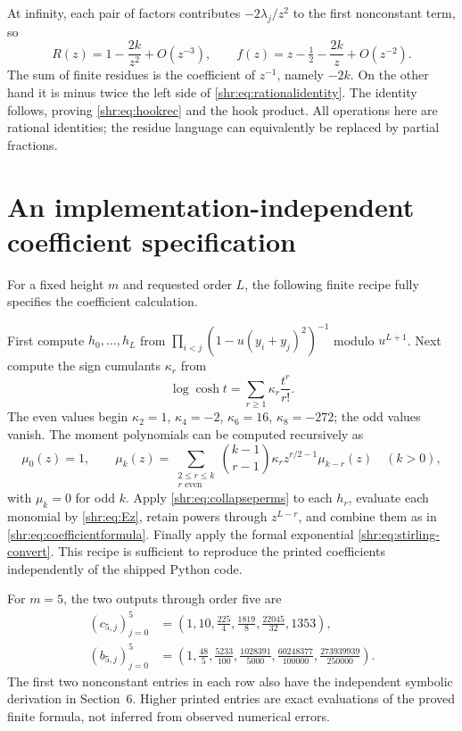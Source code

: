\documentclass[11pt,letterpaper]{article}
\numberwithin{equation}{section}
\theoremstyle{definition}
\newcommand{\1}{\mathbf 1}
\begin{document}
At infinity, each pair of factors contributes $-2\lambda_j/z^2$ to the
first nonconstant term, so
\[
 R(z)=1-\frac{2k}{z^2}+O(z^{-3}),\qquad
 f(z)=z-\tfrac12-\frac{2k}{z}+O(z^{-2}).
\]
The sum of finite residues is the coefficient of $z^{-1}$, namely $-2k$.
On the other hand it is minus twice the left side of
\eqref{shr:eq:rationalidentity}. The identity follows, proving
\eqref{shr:eq:hookrec} and the hook product. All operations here are rational
identities; the residue language can equivalently be replaced by partial
fractions.

\section{An implementation-independent coefficient specification}

For a fixed height $m$ and requested order $L$, the following finite recipe
fully specifies the coefficient calculation.

First compute $h_0,\ldots,h_L$ from
$\prod_{i<j}(1-u(y_i+y_j)^2)^{-1}$ modulo $u^{L+1}$.
Next compute the sign cumulants $\kappa_r$ from
\[
 \log\cosh t=\sum_{r\ge1}\kappa_r\frac{t^r}{r!}.
\]
The even values begin $\kappa_2=1$, $\kappa_4=-2$, $\kappa_6=16$,
$\kappa_8=-272$; the odd values vanish. The moment polynomials can be
computed recursively as
\begin{equation}
 \mu_0(z)=1,\qquad
 \mu_k(z)=\sum_{\substack{2\le r\le k\\r\text{ even}}}
 \binom{k-1}{r-1}\kappa_r z^{r/2-1}\mu_{k-r}(z)
 \quad(k>0),
 \label{shr:eq:momentrec}
\end{equation}
with $\mu_k=0$ for odd $k$.
Apply \eqref{shr:eq:collapseperms} to each $h_r$, evaluate each monomial by
\eqref{shr:eq:Ez}, retain powers through $z^{L-r}$, and combine them as in
\eqref{shr:eq:coefficientformula}. Finally apply the formal exponential
\eqref{shr:eq:stirling-convert}. This recipe is sufficient to reproduce the
printed coefficients independently of the shipped Python code.

For $m=5$, the two outputs through order five are
\begin{align*}
 (c_{5,j})_{j=0}^5&=
 \left(1,10,\frac{225}{4},\frac{1819}{8},\frac{22045}{32},1353\right),\\
 (b_{5,j})_{j=0}^5&=
 \left(1,\frac{48}{5},\frac{5233}{100},\frac{1028391}{5000},
 \frac{60248377}{100000},\frac{273939939}{250000}\right).
\end{align*}
The first two nonconstant entries in each row also have the independent
symbolic derivation in Section~6. Higher printed entries are exact
evaluations of the proved finite formula, not inferred from observed
numerical errors.
\end{document}
